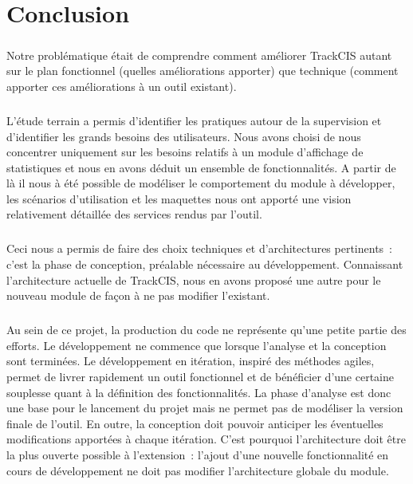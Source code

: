 \chapter*{Conclusion}
	\paragraph{}
	Notre problématique était de comprendre comment améliorer TrackCIS autant sur
	le plan fonctionnel (quelles améliorations apporter) que technique (comment
	apporter ces améliorations à un outil existant).
	
	\paragraph{}%
	L'étude terrain a permis d'identifier les pratiques autour de la supervision et
	d'identifier les grands besoins des utilisateurs. Nous avons choisi de nous
	concentrer uniquement sur les besoins relatifs à un module d'affichage de
	statistiques et nous en avons déduit un ensemble de fonctionnalités. A partir
	de là il nous à été possible de modéliser le comportement du module à
	développer, les scénarios d'utilisation et les maquettes nous ont apporté une
	vision relativement détaillée des services rendus par l'outil.
	
	\paragraph{}%
	Ceci nous a permis de faire des choix techniques et
	d'architectures pertinents~: c'est la phase de
	conception, préalable nécessaire au développement.
	Connaissant l'architecture actuelle de
	TrackCIS, nous en avons proposé une autre pour le nouveau module de façon à ne
	pas modifier l'existant.
	
	\paragraph{}%
	Au sein de ce projet, la production du code ne représente qu'une petite
	partie des efforts. Le développement ne commence que lorsque l'analyse et la
	conception sont terminées. Le développement en itération, inspiré des
	méthodes agiles, permet de livrer rapidement un outil fonctionnel et de
	bénéficier d'une certaine souplesse quant à la définition des fonctionnalités.
	La phase d'analyse est donc une base pour le lancement du projet mais ne
	permet pas de modéliser la version finale de l'outil. En outre, la
	conception doit pouvoir anticiper les éventuelles modifications apportées
	à chaque itération. C'est pourquoi l'architecture doit être la plus ouverte
	possible à l'extension~:
	l'ajout d'une nouvelle fonctionnalité en cours de développement ne doit pas
	modifier l'architecture globale du module.
	
